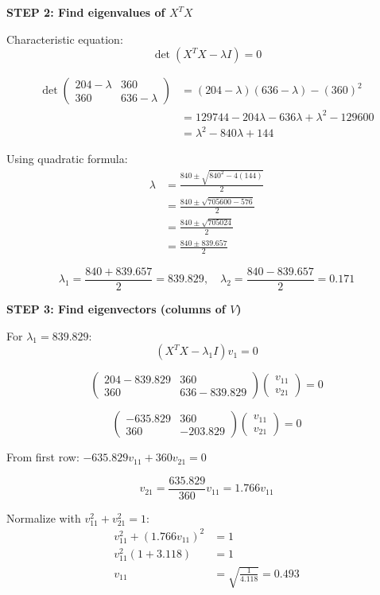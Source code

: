 \documentclass[12pt]{article}
\begin{document}
\begin{solution}
\textbf{STEP 2: Find eigenvalues of $X^T X$}

Characteristic equation:
\[
\det(X^T X - \lambda I) = 0
\]

\begin{align*}
\det\begin{pmatrix}
204 - \lambda & 360 \\
360 & 636 - \lambda
\end{pmatrix} &= (204 - \lambda)(636 - \lambda) - (360)^2 \\
&= 129744 - 204\lambda - 636\lambda + \lambda^2 - 129600 \\
&= \lambda^2 - 840\lambda + 144
\end{align*}

Using quadratic formula:
\begin{align*}
\lambda &= \frac{840 \pm \sqrt{840^2 - 4(144)}}{2} \\
&= \frac{840 \pm \sqrt{705600 - 576}}{2} \\
&= \frac{840 \pm \sqrt{705024}}{2} \\
&= \frac{840 \pm 839.657}{2}
\end{align*}

\[
\lambda_1 = \frac{840 + 839.657}{2} = 839.829, \quad \lambda_2 = \frac{840 - 839.657}{2} = 0.171
\]

\textbf{STEP 3: Find eigenvectors (columns of $V$)}

For $\lambda_1 = 839.829$:
\[
(X^T X - \lambda_1 I)v_1 = 0
\]

\[
\begin{pmatrix}
204 - 839.829 & 360 \\
360 & 636 - 839.829
\end{pmatrix}
\begin{pmatrix}
v_{11} \\
v_{21}
\end{pmatrix} = 0
\]

\[
\begin{pmatrix}
-635.829 & 360 \\
360 & -203.829
\end{pmatrix}
\begin{pmatrix}
v_{11} \\
v_{21}
\end{pmatrix} = 0
\]

From first row: $-635.829 v_{11} + 360 v_{21} = 0$

\[
v_{21} = \frac{635.829}{360} v_{11} = 1.766 v_{11}
\]

Normalize with $v_{11}^2 + v_{21}^2 = 1$:
\begin{align*}
v_{11}^2 + (1.766 v_{11})^2 &= 1 \\
v_{11}^2(1 + 3.118) &= 1 \\
v_{11} &= \sqrt{\frac{1}{4.118}} = 0.493
\end{align*}


\end{solution}
\end{document}
